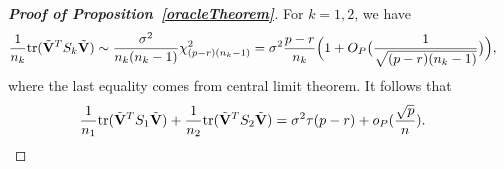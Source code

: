 \documentclass[review]{elsarticle}
\theoremstyle{plain}
\theoremstyle{definition}
\theoremstyle{remark}
\begin{document}
\begin{proof}[\textbf{Proof of Proposition~\ref{oracleTheorem}}]
    For $k=1,2$, we have
    \begin{equation*}
        \begin{aligned}
            &\frac{1}{n_k} \mathrm{tr}(\tilde{\mathbf{V}}^T S_k \tilde{\mathbf{V}})\sim \frac{\sigma^2}{n_k(n_k-1)}\chi^2_{(p-r)(n_k-1)}
            =
            \sigma^2\frac{p-r}{n_k}\Big(1+O_P\big(\frac{1}{\sqrt{(p-r)(n_k-1)}}\big)\Big),
        \end{aligned}
    \end{equation*}
    where the last equality comes from central limit theorem. It follows that
    \begin{equation}\label{prop1eq2}
        \begin{aligned}
            &\frac{1}{n_1} \mathrm{tr}(\tilde{\mathbf{V}}^T S_1 \tilde{\mathbf{V}})+
            \frac{1}{n_2} \mathrm{tr}(\tilde{\mathbf{V}}^T S_2 \tilde{\mathbf{V}})=\sigma^2 \tau (p-r)+o_P(\frac{\sqrt{p}}{n}).
        \end{aligned}
    \end{equation}


\end{proof}
\end{document}
